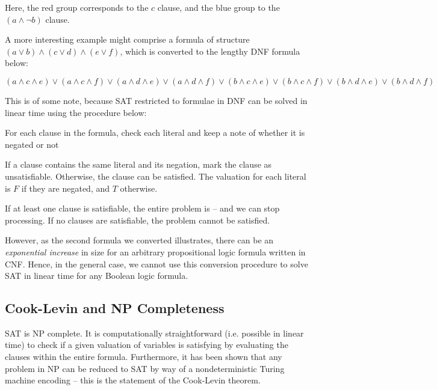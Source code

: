 \documentclass[a4paper,openany,12pt]{book}
\begin{document}
Here, the red group corresponds to the $c$ clause, and the blue group to the $(a \land \neg b)$ clause.

    A more interesting example might comprise a formula of structure  \(
    (a \lor b) \land (c \lor d) \land (e \lor f)
    \), which is converted to the lengthy DNF formula below:

    \[
    (a \land c \land e) \lor (a \land c \land f) \lor (a \land d \land e) \lor (a \land d \land
    f) \lor (b \land c \land e) \lor (b \land c \land f) \lor (b \land d \land e) \lor (b \land d \land
    f)
    \]
    \vspace{0.25em}

This is of some note, because SAT restricted to formulae in DNF can be solved in linear time using the procedure below:

\begin{outline}
    \1 For each clause in the formula, check each literal and keep a note of whether it is negated or not

    \2 If a clause contains the same literal and its negation, mark the clause as unsatisfiable.
    \2 Otherwise, the clause can be satisfied. The valuation for each literal is $F$ if they are negated, and $T$
       otherwise.

    \1 If at least one clause is satisfiable, the entire problem is -- and we can stop processing.
    \1 If no clauses are satisfiable, the problem cannot be satisfied.
\end{outline}

However, as the second formula we converted illustrates, there can be an \emph{exponential increase} in size for an
arbitrary propositional logic formula written in CNF.
Hence, in the general case, we cannot use this conversion procedure to solve SAT in linear time for any Boolean logic
formula.

\subsection{Cook-Levin and NP Completeness}

SAT is NP complete.
It is computationally straightforward (i.e. possible in linear time) to check if a given valuation of variables is
satisfying by evaluating the clauses within the entire formula.
Furthermore, it has been shown that any problem in NP can be reduced to SAT by way of a nondeterministic Turing machine
encoding \citep{Cook:1971:CTP:800157.805047} -- this is the statement of the Cook-Levin theorem.
\end{document}
